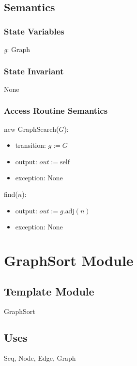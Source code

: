 \documentclass[12pt]{article}
\begin{document}
\subsection*{Semantics}

\subsubsection*{State Variables}

\textit{g}: Graph

\subsubsection*{State Invariant}

None

\subsubsection*{Access Routine Semantics}

\noindent new GraphSearch($G$):
\begin{itemize}
	\item transition: $\textit{g} := G$
	\item output: $out := \mbox{self}$
	\item exception: None
\end{itemize}

\noindent find($n$):
\begin{itemize}
	\item output: $out := \textit{g}.\mbox{adj}(n)$
	\item exception: None
\end{itemize}

\newpage

\section{GraphSort Module}

\subsection*{Template Module}

GraphSort

\subsection*{Uses}

Seq, Node, Edge, Graph
\end{document}
